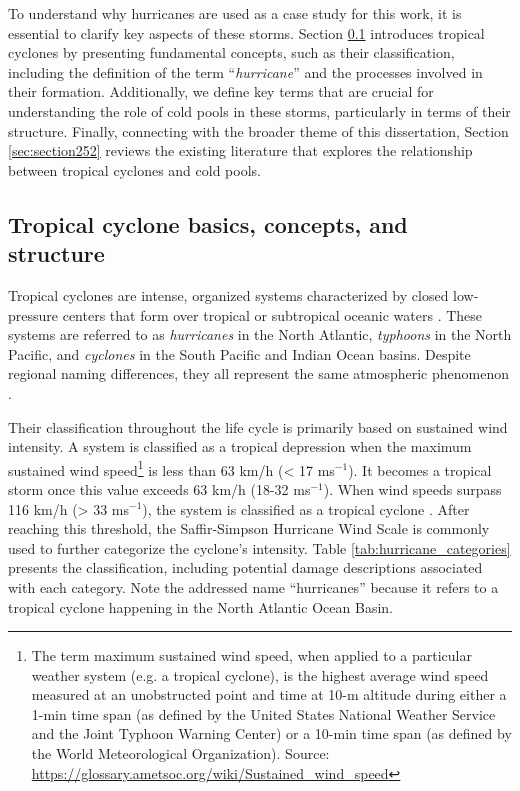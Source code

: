To understand why hurricanes are used as a case study for this work, it is essential to clarify key aspects of these storms. Section \ref{sec:section251} introduces tropical cyclones by presenting fundamental concepts, such as their classification, including the definition of the term ``\textit{hurricane}'' and the processes involved in their formation. Additionally, we define key terms that are crucial for understanding the role of cold pools in these storms, particularly in terms of their structure. Finally, connecting with the broader theme of this dissertation, Section \ref{sec:section252} reviews the existing literature that explores the relationship between tropical cyclones and cold pools.

\subsection{Tropical cyclone basics, concepts, and structure}
\label{sec:section251}

Tropical cyclones are intense, organized systems characterized by closed low-pressure centers that form over tropical or subtropical oceanic waters \cite{houze2010clouds, perez2021performance, lin2022tropical}. These systems are referred to as \textit{hurricanes} in the North Atlantic, \textit{typhoons} in the North Pacific, and \textit{cyclones} in the South Pacific and Indian Ocean basins. Despite regional naming differences, they all represent the same atmospheric phenomenon \cite{houze2010clouds, wmo_classification_tropical_cyclones_2023} .

Their classification throughout the life cycle is primarily based on sustained wind intensity. A system is classified as a tropical depression when the maximum sustained wind speed\footnote{The term maximum sustained wind speed, when applied to a particular weather system (e.g. a tropical cyclone), is the highest average wind speed measured at an unobstructed point and time at 10-m altitude during either a 1-min time span (as defined by the United States National Weather Service and the Joint Typhoon Warning Center) or a 10-min time span (as defined by the World Meteorological Organization). Source: \url{https://glossary.ametsoc.org/wiki/Sustained\_wind\_speed}} is less than 63 km/h (< 17 ms$^{-1}$). It becomes a tropical storm once this value exceeds 63 km/h (18-32 ms$^{-1}$). When wind speeds surpass 116 km/h (> 33 ms$^{-1}$), the system is classified as a tropical cyclone \cite{houze2010clouds, wmo_classification_tropical_cyclones_2023}. After reaching this threshold, the Saffir-Simpson Hurricane Wind Scale \cite{saffir1973hurricane, simpson1974hurricane} is commonly used to further categorize the cyclone’s intensity. Table \ref{tab:hurricane_categories} presents the classification, including potential damage descriptions associated with each category. Note the addressed name “hurricanes” because it refers to a tropical cyclone happening in the North Atlantic Ocean Basin.

